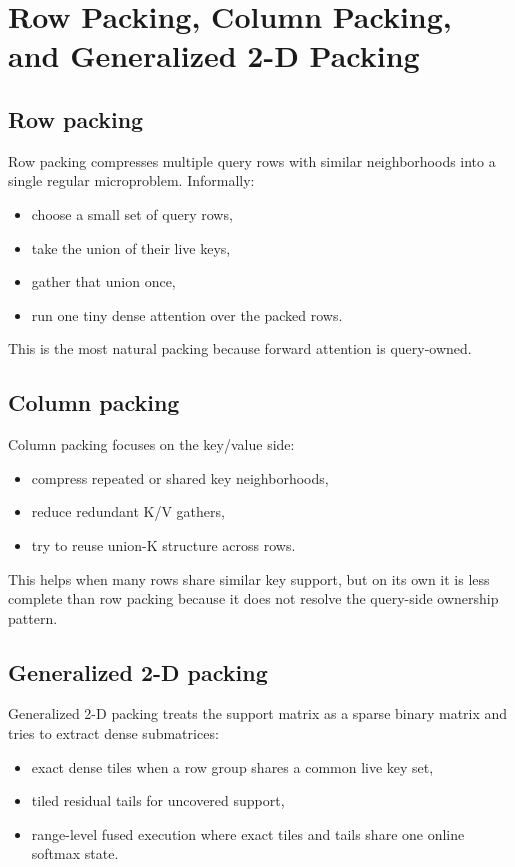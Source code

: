 \documentclass[11pt]{article}
\begin{document}
\section{Row Packing, Column Packing, and Generalized 2-D Packing}

\subsection{Row packing}

Row packing compresses multiple query rows with similar neighborhoods into a
single regular microproblem. Informally:
\begin{itemize}[leftmargin=1.5em]
    \item choose a small set of query rows,
    \item take the union of their live keys,
    \item gather that union once,
    \item run one tiny dense attention over the packed rows.
\end{itemize}

This is the most natural packing because forward attention is query-owned.

\subsection{Column packing}

Column packing focuses on the key/value side:
\begin{itemize}[leftmargin=1.5em]
    \item compress repeated or shared key neighborhoods,
    \item reduce redundant K/V gathers,
    \item try to reuse union-K structure across rows.
\end{itemize}

This helps when many rows share similar key support, but on its own it is less
complete than row packing because it does not resolve the query-side ownership
pattern.

\subsection{Generalized 2-D packing}

Generalized 2-D packing treats the support matrix as a sparse binary matrix and
tries to extract dense submatrices:
\begin{itemize}[leftmargin=1.5em]
    \item exact dense tiles when a row group shares a common live key set,
    \item tiled residual tails for uncovered support,
    \item range-level fused execution where exact tiles and tails share one
    online softmax state.
\end{itemize}
\end{document}
